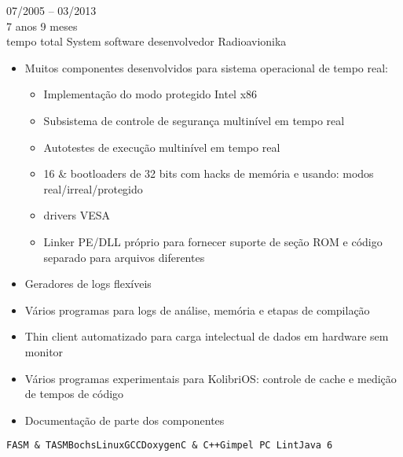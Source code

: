 \begin{entrylist}
    \entry
    {07/2005 -- 03/2013\\\footnotesize{7 anos 9 meses\\tempo total}}
    {System software desenvolvedor}
    {Radioavionika}
    {
        \vspace{-4mm}
        \begin{itemize}[leftmargin=.12in]
            \item Muitos componentes desenvolvidos para sistema operacional de tempo real:
            \begin{itemize}
                \setlength\itemsep{0em}
                \item Implementação do modo protegido Intel x86
                \item Subsistema de controle de segurança multinível em tempo real
                \item Autotestes de execução multinível em tempo real
                \item 16 \& bootloaders de 32 bits com hacks de memória e usando: modos real/irreal/protegido
                \item drivers VESA
                \item Linker PE/DLL próprio para fornecer suporte de seção ROM e código separado para arquivos diferentes
            \end{itemize}
            \item Geradores de logs flexíveis
            \item Vários programas para logs de análise, memória e etapas de compilação
            \item Thin client automatizado para carga intelectual de dados em hardware sem monitor
            \item Vários programas experimentais para KolibriOS: controle de cache e medição de tempos de código
            \item Documentação de parte dos componentes
        \end{itemize}
    \texttt{FASM \& TASM}\slashsep\texttt{Bochs}\slashsep\texttt{Linux}\slashsep\texttt{GCC}\slashsep\texttt{Doxygen}\slashsep\texttt{C \& C++}\slashsep\texttt{Gimpel PC Lint}\slashsep\texttt{Java 6}}

\end{entrylist}
